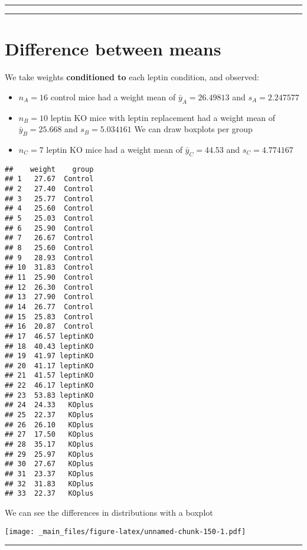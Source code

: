 \documentclass[
]{book}
\begin{document}
\begin{center}\rule{0.5\linewidth}{0.5pt}\end{center}

\begin{center}\rule{0.5\linewidth}{0.5pt}\end{center}

\hypertarget{difference-between-means-9}{%
\section{Difference between means}\label{difference-between-means-9}}

We take weights \textbf{conditioned to} each leptin condition, and observed:

\begin{itemize}
\item
  \(n_A=16\) control mice had a weight mean of \(\bar{y}_A=26.49813\) and \(s_A=2.247577\)
\item
  \(n_B=10\) leptin KO mice with leptin replacement had a weight mean of \(\bar{y}_B=25.668\) and \(s_B=5.034161\)
  We can draw boxplots per group
\item
  \(n_C=7\) leptin KO mice had a weight mean of \(\bar{y}_C=44.53\) and \(s_C=4.774167\)
\end{itemize}

\begin{verbatim}
##    weight    group
## 1   27.67  Control
## 2   27.40  Control
## 3   25.77  Control
## 4   25.60  Control
## 5   25.03  Control
## 6   25.90  Control
## 7   26.67  Control
## 8   25.60  Control
## 9   28.93  Control
## 10  31.83  Control
## 11  25.90  Control
## 12  26.30  Control
## 13  27.90  Control
## 14  26.77  Control
## 15  25.83  Control
## 16  20.87  Control
## 17  46.57 leptinKO
## 18  40.43 leptinKO
## 19  41.97 leptinKO
## 20  41.17 leptinKO
## 21  41.57 leptinKO
## 22  46.17 leptinKO
## 23  53.83 leptinKO
## 24  24.33   KOplus
## 25  22.37   KOplus
## 26  26.10   KOplus
## 27  17.50   KOplus
## 28  35.17   KOplus
## 29  25.97   KOplus
## 30  27.67   KOplus
## 31  23.37   KOplus
## 32  31.83   KOplus
## 33  22.37   KOplus
\end{verbatim}

We can see the differences in distributions with a boxplot

\texttt{[image: \_main\_files/figure-latex/unnamed-chunk-150-1.pdf]}

\begin{center}\rule{0.5\linewidth}{0.5pt}\end{center}
\end{document}
